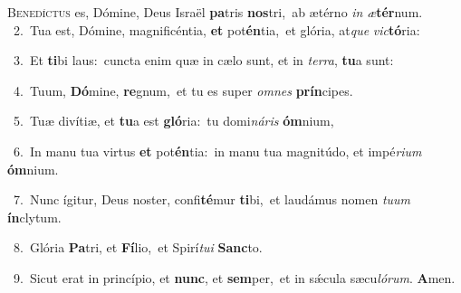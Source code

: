 \lettrine{\initial\textcolor{\initialcolor}{B}}{enedíctus} es, Dómine, Deus Israël \textbf{pa}\-tris \textbf{nos}\-tri,~\star ab ætérno \textit{in} \textit{æ}\-\textbf{tér}num.\\
{\numbfont\textcolor{\numbcolor}{~2.}}~Tua est, Dómine, magnificéntia, \textbf{et} pot\-\textbf{én}\-tia,~\star et glória, at\textit{que} \textit{vic}\-\textbf{tó}ria:\par
{\numbfont\textcolor{\numbcolor}{~3.}}~Et \textbf{ti}\-bi laus:~\star cuncta enim quæ in cælo sunt, et in \textit{ter}\-\textit{ra}, \textbf{tu}\-a sunt:\par
{\numbfont\textcolor{\numbcolor}{~4.}}~Tuum, \textbf{Dó}\-mine, \textbf{re}\-gnum,~\star et tu es super \textit{om}\-\textit{nes} \textbf{prín}\-cipes.\par
{\numbfont\textcolor{\numbcolor}{~5.}}~Tuæ divítiæ, et \textbf{tu}\-a est \textbf{gló}\-ria:~\star tu domi\-\textit{ná}\-\textit{ris} \textbf{óm}\-nium,\par
{\numbfont\textcolor{\numbcolor}{~6.}}~In manu tua virtus \textbf{et} pot\-\textbf{én}\-tia:~\star in manu tua magnitúdo, et impé\-\textit{ri}\-\textit{um} \textbf{óm}\-nium.\par
{\numbfont\textcolor{\numbcolor}{~7.}}~Nunc ígitur, Deus noster, confi\-\textbf{té}\-mur \textbf{ti}\-bi,~\star et laudámus nomen \textit{tu}\-\textit{um} \textbf{ín}\-clytum.\par
{\numbfont\textcolor{\numbcolor}{~8.}}~Glória \textbf{Pa}\-tri, et \textbf{Fí}\-lio,~\star et Spirí\-\textit{tu}\-\textit{i} \textbf{Sanc}\-to.\par
{\numbfont\textcolor{\numbcolor}{~9.}}~Sicut erat in princípio, et \textbf{nunc}\-, et \textbf{sem}\-per,~\star et in sǽcula sæcu\-\textit{ló}\-\textit{rum}. \textbf{A}\-men.\par
